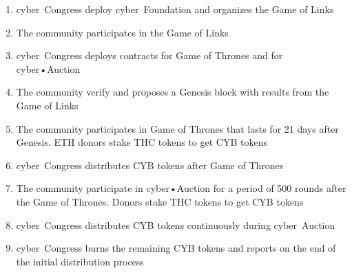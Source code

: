 \documentclass[8pt,oneside]{amsart}
\begin{document}
\begin{enumerate}
 \item cyber~Congress deploy cyber~Foundation and organizes the Game of Links
 \item The community participates in the Game of Links
 \item cyber~Congress deploys contracts for Game of Thrones and for cyber•Auction
 \item The community verify and proposes a Genesis block with results from the Game of Links
 \item The community participates in Game of Thrones that lasts for 21 days after Genesis. ETH donors stake THC tokens to get CYB tokens
 \item cyber~Congress distributes CYB tokens after Game of Thrones
 \item The community participate in cyber•Auction for a period of 500 rounds after the Game of Thrones. Donors stake THC tokens to get CYB tokens
 \item cyber~Congress distributes CYB tokens continuously during cyber~Auction
 \item cyber~Congress burns the remaining CYB tokens and reports on the end of the initial distribution process
\end{enumerate}
\end{document}
